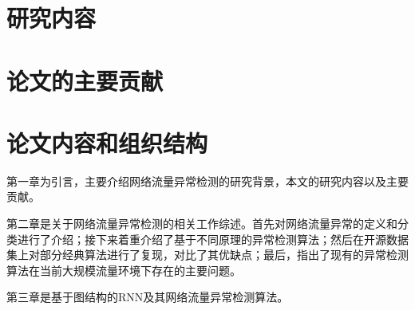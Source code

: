 \section{研究内容}

\section{论文的主要贡献}

\section{论文内容和组织结构}
第一章为引言，主要介绍网络流量异常检测的研究背景，本文的研究内容以及主要贡献。

第二章是关于网络流量异常检测的相关工作综述。首先对网络流量异常的定义和分类进行了介绍；接下来着重介绍了基于不同原理的异常检测算法；然后在开源数据集上对部分经典算法进行了复现，对比了其优缺点；最后，指出了现有的异常检测算法在当前大规模流量环境下存在的主要问题。

第三章是基于图结构的RNN及其网络流量异常检测算法。